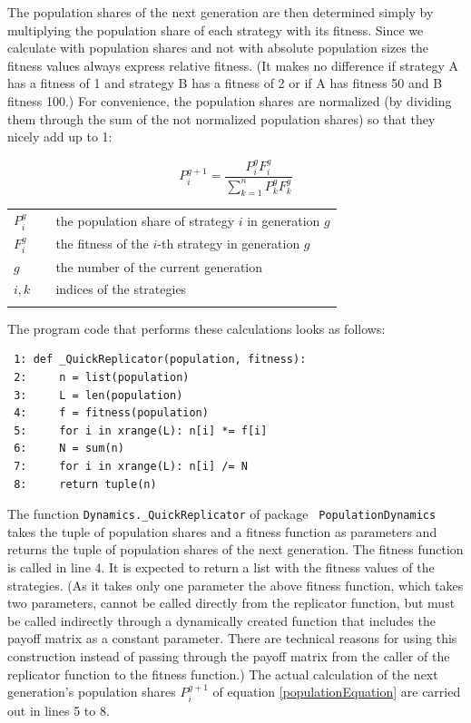 The population shares of the next generation are then determined simply by
multiplying the population share of each strategy with its fitness. Since we
calculate with population shares and not with absolute population sizes the
fitness values always express relative fitness. (It makes no difference if
strategy A has a fitness of 1 and strategy B has a fitness of 2 or if A has
fitness 50 and B fitness 100.)  For convenience, the population shares are
normalized (by dividing them through the sum of the not normalized population
shares) so that they nicely add up to 1:

\begin{equation}
\label{populationEquation}
P_i^{g+1} = \frac{P_i^gF_i^g}{\sum_{k=1}^n P_k^gF_k^g}
\end{equation}
\begin{tabular}{lll}
$P_i^g$ & & the population share of strategy $i$ in generation $g$ \\
$F_i^g$ & & the fitness of the $i$-th strategy in generation $g$ \\
$g$ & & the number of the current generation \\
$i,k$ & & indices of the strategies \\
& & \\
\end{tabular} 

The program code that performs these calculations looks as follows:

\begin{scriptsize}
\begin{verbatim}
 1: def _QuickReplicator(population, fitness):
 2:     n = list(population)
 3:     L = len(population)
 4:     f = fitness(population)
 5:     for i in xrange(L): n[i] *= f[i]
 6:     N = sum(n)
 7:     for i in xrange(L): n[i] /= N
 8:     return tuple(n)
\end{verbatim}
\end{scriptsize}

The function {\tt Dynamics\-.\-\_Quick\-Replicator} of package {\tt
  Population\-Dynamics} takes the tuple of population shares and a
fitness function as parameters and returns the tuple of population
shares of the next generation. The fitness function is called in line
4. It is expected to return a list with the fitness values of the
strategies. (As it takes only one parameter the above fitness
function, which takes two parameters, cannot be called directly from
the replicator function, but must be called indirectly through a
dynamically created function that includes the payoff matrix as a
constant parameter. There are technical reasons for using this
construction instead of passing through the payoff matrix from the
caller of the replicator function to the fitness function.) The actual
calculation of the next generation's population shares $P_i^{g+1}$ of
equation \ref{populationEquation} are carried out in lines 5 to 8.

